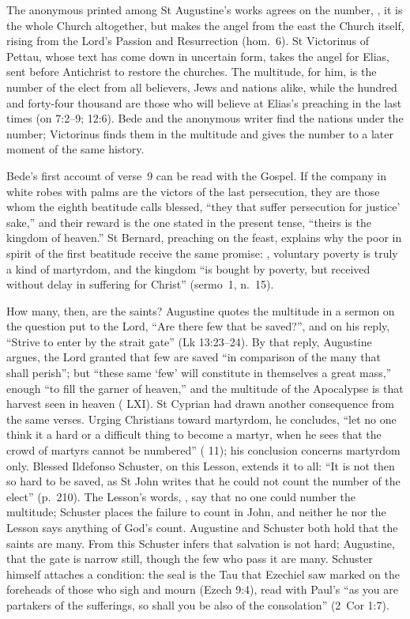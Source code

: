 The anonymous  printed among St Augustine's
works agrees on the number, , it is the whole
Church altogether, but makes the angel from the east the Church itself,
rising from the Lord's Passion and Resurrection (hom.~6). St Victorinus of
Pettau, whose text has come down in uncertain form, takes the angel for
Elias, sent before Antichrist to restore the churches. The multitude, for
him, is the number of the elect from all believers, Jews and nations alike,
while the hundred and forty-four thousand are those who will believe at
Elias's preaching in the last times (on 7:2--9; 12:6). Bede and the anonymous
writer find the nations under the number; Victorinus finds them in the
multitude and gives the number to a later moment of the same history.

Bede's first account of verse~9 can be read with the Gospel. If the company in white
robes with palms are the victors of the last persecution, they are those whom
the eighth beatitude calls blessed, ``they that suffer persecution for
justice' sake,'' and their reward is the one stated in the present tense,
``theirs is the kingdom of heaven.'' St Bernard, preaching on the feast,
explains why the poor in spirit of the first beatitude receive the same
promise: , voluntary
poverty is truly a kind of martyrdom, and the kingdom ``is bought by poverty,
but received without delay in suffering for Christ'' (sermo~1, n.~15).

How many, then, are the saints? Augustine quotes the multitude in a sermon on
the question put to the Lord, ``Are there few that be saved?'', and on his
reply, ``Strive to enter by the strait gate'' (Lk 13:23--24). By that reply,
Augustine argues, the Lord granted that few are saved ``in comparison of the
many that shall perish''; but ``these same `few' will constitute in themselves
a great mass,'' enough ``to fill the garner of heaven,'' and the multitude of
the Apocalypse is that harvest seen in heaven ( LXI). St Cyprian
had drawn another consequence from the same verses. Urging Christians toward
martyrdom, he concludes, ``let no one think it a hard or a difficult thing to
become a martyr, when he sees that the crowd of martyrs cannot be numbered''
( 11); his conclusion concerns martyrdom only. Blessed
Ildefonso Schuster, on this Lesson, extends it to all: ``It is not then so hard
to be saved, as St John writes that he could not count the number of the
elect'' (p.~210). The Lesson's words, ,
say that no one could number the multitude; Schuster places the failure to
count in John, and neither he nor the Lesson says anything of God's count.
Augustine and Schuster both hold that the saints are many. From this Schuster
infers that salvation is not hard; Augustine, that the gate is narrow still,
though the few who pass it are many. Schuster himself attaches a condition:
the seal is the Tau that Ezechiel saw marked on the foreheads of those who
sigh and mourn (Ezech 9:4), read with Paul's ``as you are partakers of the
sufferings, so shall you be also of the consolation'' (2~Cor 1:7).

